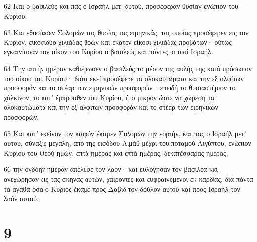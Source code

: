 \par 62 Και ο βασιλεύς και πας ο Ισραήλ μετ' αυτού, προσέφεραν θυσίαν ενώπιον του Κυρίου.
\par 63 Και εθυσίασεν Σολομών τας θυσίας τας ειρηνικάς, τας οποίας προσέφερεν εις τον Κύριον, εικοσιδύο χιλιάδας βοών και εκατόν είκοσι χιλιάδας προβάτων· ούτως εγκαινίασαν τον οίκον του Κυρίου ο βασιλεύς και πάντες οι υιοί Ισραήλ.
\par 64 Την αυτήν ημέραν καθιέρωσεν ο βασιλεύς το μέσον της αυλής της κατά πρόσωπον του οίκου του Κυρίου· διότι εκεί προσέφερε τα ολοκαυτώματα και την εξ αλφίτων προσφοράν και το στέαρ των ειρηνικών προσφορών· επειδή το θυσιαστήριον το χάλκινον, το κατ' έμπροσθεν του Κυρίου, ήτο μικρόν ώστε να χωρέση τα ολοκαυτώματα και την εξ αλφίτων προσφοράν και το στέαρ των ειρηνικών προσφορών.
\par 65 Και κατ' εκείνον τον καιρόν έκαμεν Σολομών την εορτήν, και πας ο Ισραήλ μετ' αυτού, σύναξις μεγάλη, από της εισόδου Αιμάθ μέχρι του ποταμού Αιγύπτου, ενώπιον Κυρίου του Θεού ημών, επτά ημέρας και επτά ημέρας, δεκατέσσαρας ημέρας.
\par 66 την ογδόην ημέραν απέλυσε τον λαόν· και ευλόγησαν τον βασιλέα και ανεχώρησαν εις τας σκηνάς αυτών, χαίροντες και ευφραινόμενοι εκ καρδίας, διά πάντα τα αγαθά όσα ο Κύριος έκαμε προς Δαβίδ τον δούλον αυτού και προς Ισραήλ τον λαόν αυτού.

\chapter{9}

